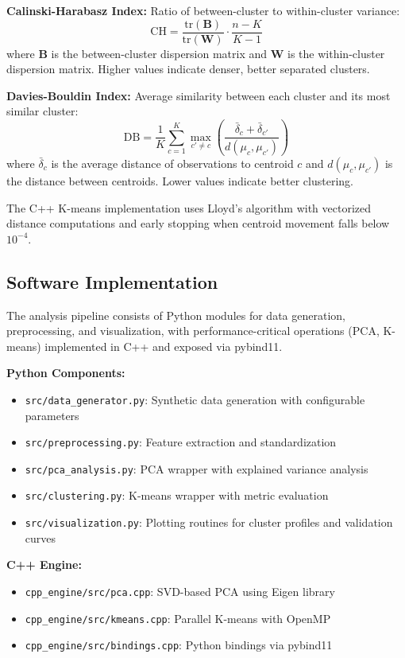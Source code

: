 \documentclass[11pt]{article}
\begin{document}
\textbf{Calinski-Harabasz Index:} Ratio of between-cluster to within-cluster variance:
\begin{equation}
\text{CH} = \frac{\text{tr}(\mathbf{B})}{\text{tr}(\mathbf{W})} \cdot \frac{n - K}{K - 1}
\end{equation}
where $\mathbf{B}$ is the between-cluster dispersion matrix and $\mathbf{W}$ is the within-cluster dispersion matrix. Higher values indicate denser, better separated clusters.

\textbf{Davies-Bouldin Index:} Average similarity between each cluster and its most similar cluster:
\begin{equation}
\text{DB} = \frac{1}{K} \sum_{c=1}^{K} \max_{c' \neq c} \left( \frac{\bar{\delta}_c + \bar{\delta}_{c'}}{d(μ_c, μ_{c'})} \right)
\end{equation}
where $\bar{\delta}_c$ is the average distance of observations to centroid $c$ and $d(\mu_c, \mu_{c'})$ is the distance between centroids. Lower values indicate better clustering.

The C++ K-means implementation uses Lloyd's algorithm with vectorized distance computations and early stopping when centroid movement falls below $10^{-4}$.

\subsection{Software Implementation}

The analysis pipeline consists of Python modules for data generation, preprocessing, and visualization, with performance-critical operations (PCA, K-means) implemented in C++ and exposed via pybind11.

\textbf{Python Components:}
\begin{itemize}
    \item \texttt{src/data\_generator.py}: Synthetic data generation with configurable parameters
    \item \texttt{src/preprocessing.py}: Feature extraction and standardization
    \item \texttt{src/pca\_analysis.py}: PCA wrapper with explained variance analysis
    \item \texttt{src/clustering.py}: K-means wrapper with metric evaluation
    \item \texttt{src/visualization.py}: Plotting routines for cluster profiles and validation curves
\end{itemize}

\textbf{C++ Engine:}
\begin{itemize}
    \item \texttt{cpp\_engine/src/pca.cpp}: SVD-based PCA using Eigen library
    \item \texttt{cpp\_engine/src/kmeans.cpp}: Parallel K-means with OpenMP
    \item \texttt{cpp\_engine/src/bindings.cpp}: Python bindings via pybind11
\end{itemize}
\end{document}
